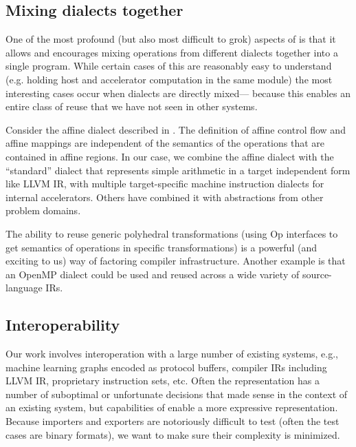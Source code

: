 \subsection{Mixing dialects together}

One of the most profound (but also most difficult to grok) aspects of \MLIR
is that it allows and encourages mixing operations from different dialects
together into a single program.  While certain cases of this are reasonably
easy to understand (e.g. holding host and accelerator computation in the same
module) the most interesting cases occur when dialects are directly mixed---
because this enables an entire class of reuse that we have not seen in other
systems.

Consider the affine dialect described in . The definition
of affine control flow and affine mappings are independent of the semantics of
the operations that are contained in affine regions.  In our case, we combine
the affine dialect with the ``standard'' dialect that represents simple arithmetic
in a target independent form like LLVM IR, with multiple target-specific machine
instruction dialects for internal accelerators. Others have combined it with
abstractions from other problem domains.

The ability to reuse generic polyhedral transformations (using Op interfaces to
get semantics of operations in specific transformations) is a powerful (and
exciting to us) way of factoring compiler infrastructure. Another
example is that an OpenMP dialect could be used and reused across a wide variety
of source-language IRs.

\subsection{Interoperability}

Our work involves interoperation with a large number of existing systems, e.g.,
machine learning graphs encoded as protocol buffers, compiler IRs including
LLVM IR, proprietary instruction sets, etc.  Often the representation has a
number of suboptimal or unfortunate decisions that made sense in the context of
an existing system, but capabilities of \MLIR enable a more expressive
representation. Because importers and exporters are notoriously
difficult to test (often the test cases are binary formats), we want to make
sure their complexity is minimized.

